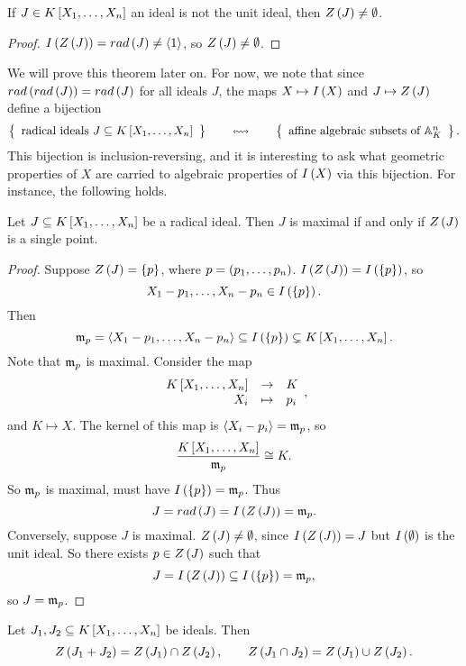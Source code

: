 \begin{corollary}
If $ J \in K\sb{X_1, \dots, X_n} $ an ideal is not the unit ideal, then $ Z\rb{J} \ne \emptyset $.
\end{corollary}

\begin{proof}
$ I\rb{Z\rb{J}} = rad\rb{J} \ne \ab{1} $, so $ Z\rb{J} \ne \emptyset $.
\end{proof}


We will prove this theorem later on. For now, we note that since $ rad\rb{rad\rb{J}} = rad\rb{J} $ for all ideals $ J $, the maps $ X \mapsto I\rb{X} $ and $ J \mapsto Z\rb{J} $ define a bijection
$$ \correspondence{\text{radical ideals} \ J \subseteq K\sb{X_1, \dots, X_n}}{\text{affine algebraic subsets of} \ \A_K^n}. $$
This bijection is inclusion-reversing, and it is interesting to ask what geometric properties of $ X $ are carried to algebraic properties of $ I\rb{X} $ via this bijection. For instance, the following holds.

\begin{proposition}
Let $ J \subseteq K\sb{X_1, \dots, X_n} $ be a radical ideal. Then $ J $ is maximal if and only if $ Z\rb{J} $ is a single point.
\end{proposition}

\begin{proof}
Suppose $ Z\rb{J} = \cb{p} $, where $ p = \rb{p_1, \dots, p_n} $. $ I\rb{Z\rb{J}} = I\rb{\cb{p}} $, so
$$ X_1 - p_1, \dots, X_n - p_n \in I\rb{\cb{p}}. $$
Then
$$ \mm_p = \ab{X_1 - p_1, \dots, X_n - p_n} \subseteq I\rb{\cb{p}} \subsetneq K\sb{X_1, \dots, X_n}. $$
Note that $ \mm_p $ is maximal. Consider the map
$$ \function{K\sb{X_1, \dots, X_n}}{K}{X_i}{p_i}, $$
and $ K \mapsto X $. The kernel of this map is $ \ab{X_i - p_i} = \mm_p $, so
$$ \dfrac{K\sb{X_1, \dots, X_n}}{\mm_p} \cong K. $$
So $ \mm_p $ is maximal, must have $ I\rb{\cb{p}} = \mm_p $. Thus
$$ J = rad\rb{J} = I\rb{Z\rb{J}} = \mm_p. $$
Conversely, suppose $ J $ is maximal. $ Z\rb{J} \ne \emptyset $, since $ I\rb{Z\rb{J}} = J $ but $ I\rb{\emptyset} $ is the unit ideal. So there exists $ p \in Z\rb{J} $ such that
$$ J = I\rb{Z\rb{J}} \subseteq I\rb{\cb{p}} = \mm_p, $$
so $ J = \mm_p $.
\end{proof}

\pagebreak

\begin{proposition}
Let $ J_1, J_2 \subseteq K\sb{X_1, \dots, X_n} $ be ideals. Then
$$ Z\rb{J_1 + J_2} = Z\rb{J_1} \cap Z\rb{J_2}, \qquad Z\rb{J_1 \cap J_2} = Z\rb{J_1} \cup Z\rb{J_2}. $$
\end{proposition}


